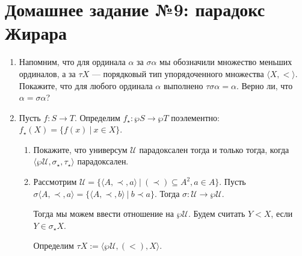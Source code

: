 \documentclass[10pt,a4paper,oneside]{article}
\begin{document}
\section*{Домашнее задание №9: парадокс Жирара}
\begin{enumerate}
\item Напомним, что для ординала $\alpha$ за $\sigma\alpha$ мы обозначили множество меньших ординалов,
а за $\tau X$ --- порядковый тип упорядоченного множества $\langle X,< \rangle$. 
Покажите, что для любого ординала $\alpha$ выполнено $\tau\sigma\alpha = \alpha$.
Верно ли, что $\alpha=\sigma\alpha$?
\item Пусть $f: S \rightarrow T$. Определим $f_\star : \wp S \rightarrow \wp T$ поэлементно: $f_\star(X) = \{ f(x)\ |\ x \in X \}$.
\begin{enumerate}
\item Покажите, что универсум $\mathcal{U}$ парадоксален тогда и только тогда, когда $\langle \wp\mathcal{U}, \sigma_\star, \tau_\star\rangle$ 
парадоксален. 
\item Рассмотрим $\mathcal{U} = \{\langle A, \prec, a \rangle\ |\ (\prec) \subseteq A^2, a \in A\}$.
Пусть $\sigma\langle A, \prec, a \rangle = \{\langle A, \prec, b\rangle\ |\ b \prec a\}$. Тогда $\sigma : \mathcal{U} \rightarrow \wp\mathcal{U}$.

Тогда мы можем ввести отношение на $\wp\mathcal{U}$. Будем считать $Y < X$, если $Y \in \sigma_\star X$.

Определим $\tau X := \langle \wp \mathcal{U}, (<), X\rangle$.


\end{enumerate}
\end{enumerate}
\end{document}
